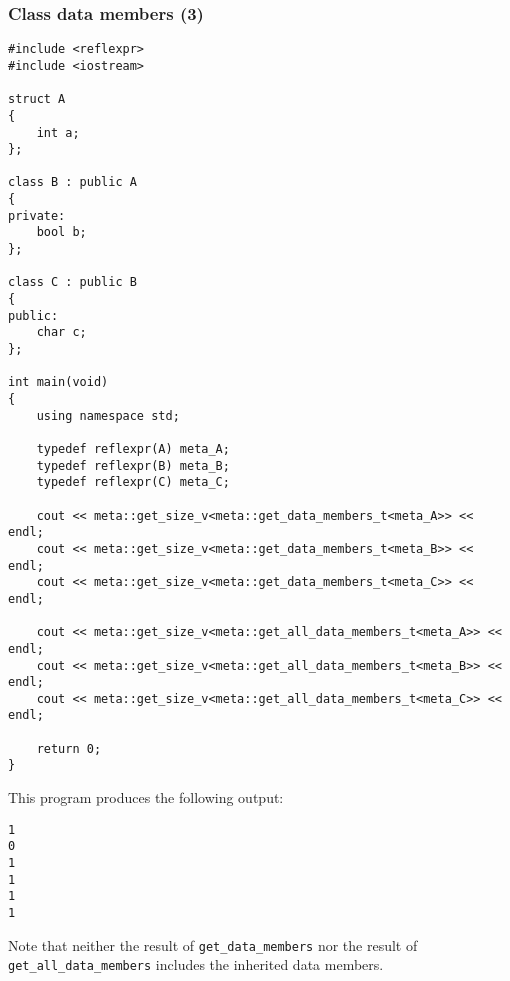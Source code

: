 \subsubsection{Class data members (3)}

\begin{verbatim}
#include <reflexpr>
#include <iostream>

struct A
{
	int a;
};

class B : public A
{
private:
	bool b;
};

class C : public B
{
public:
	char c;
};

int main(void)
{
	using namespace std;

	typedef reflexpr(A) meta_A;
	typedef reflexpr(B) meta_B;
	typedef reflexpr(C) meta_C;

	cout << meta::get_size_v<meta::get_data_members_t<meta_A>> << endl;
	cout << meta::get_size_v<meta::get_data_members_t<meta_B>> << endl;
	cout << meta::get_size_v<meta::get_data_members_t<meta_C>> << endl;

	cout << meta::get_size_v<meta::get_all_data_members_t<meta_A>> << endl;
	cout << meta::get_size_v<meta::get_all_data_members_t<meta_B>> << endl;
	cout << meta::get_size_v<meta::get_all_data_members_t<meta_C>> << endl;

	return 0;
}
\end{verbatim}

This program produces the following output:

\begin{verbatim}
1
0
1
1
1
1
\end{verbatim}

Note that neither the result of \texttt{get\_data\_members} nor the result of
\texttt{get\_all\_data\_members} includes the inherited data members.
